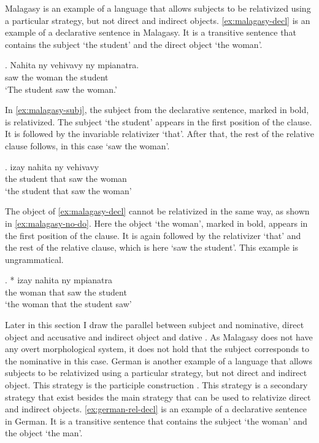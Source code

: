 Malagasy is an example of a language that allows subjects to be relativized using a particular strategy, but not direct and indirect objects. \ref{ex:malagasy-decl} is an example of a declarative sentence in Malagasy. It is a transitive sentence that contains the subject  `the student' and the direct object  `the woman'.

\exg. Nahita ny vehivavy ny mpianatra.\\
 saw the woman the student\\
 `The student saw the woman.' \label{ex:malagasy-decl}

In \ref{ex:malagasy-subj}, the subject from the declarative sentence, marked in bold, is relativized. The subject  `the student' appears in the first position of the clause. It is followed by the invariable relativizer  `that'. After that, the rest of the relative clause follows, in this case  `saw the woman'.

\exg.   izay nahita ny vehivavy\\
 the student that saw the woman\\
 `the student that saw the woman' \label{ex:malagasy-subj}

The object of \ref{ex:malagasy-decl} cannot be relativized in the same way, as shown in \ref{ex:malagasy-no-do}. Here the object  `the woman', marked in bold, appears in the first position of the clause. It is again followed by the relativizer  `that' and the rest of the relative clause, which is here  `saw the student'. This example is ungrammatical.

\exg. *  izay nahita ny mpianatra\\
 the woman that saw the student\\
 `the woman that the student saw' \label{ex:malagasy-no-do}

Later in this section I draw the parallel between subject and nominative, direct object and accusative and indirect object and dative \citep[after][]{caha2009}. As Malagasy does not have any overt morphological system, it does not hold that the subject corresponds to the nominative in this case.
German is another example of a language that allows subjects to be relativized using a particular strategy, but not direct and indirect object. This strategy is the participle construction \citep{keenan1977}. This strategy is a secondary strategy that exist besides the main strategy that can be used to relativize direct and indirect objects. \ref{ex:german-rel-decl} is an example of a declarative sentence in German. It is a transitive sentence that contains the subject  `the woman' and the object  `the man'.

